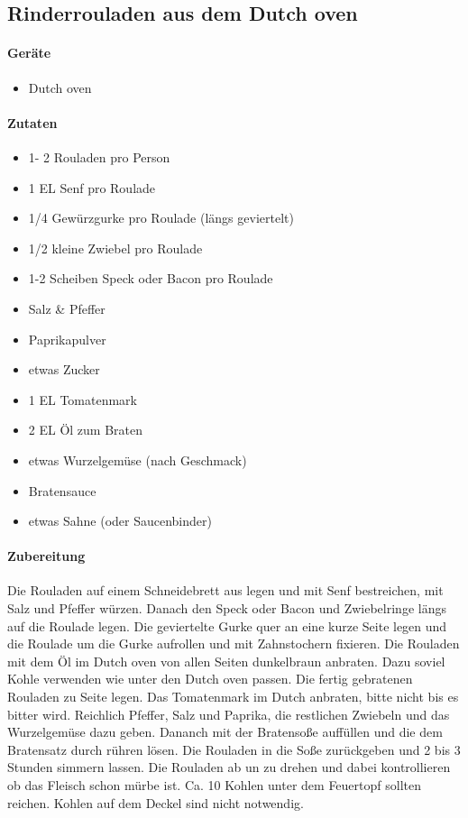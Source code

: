 \subsection{Rinderrouladen aus dem Dutch oven}

\paragraph{Geräte}

\begin{itemize}[noitemsep]
	\item Dutch oven
\end{itemize}

\paragraph{Zutaten}

\begin{itemize}[noitemsep]
	\item 1- 2 Rouladen pro Person
	\item 1 EL Senf pro Roulade
	\item 1/4 Gewürzgurke pro Roulade (längs geviertelt)
	\item 1/2 kleine Zwiebel pro Roulade
	\item 1-2 Scheiben Speck oder Bacon pro Roulade
	\item Salz \& Pfeffer
	\item Paprikapulver
	\item etwas Zucker
	\item 1 EL Tomatenmark
	\item 2 EL Öl zum Braten
	\item etwas Wurzelgemüse (nach Geschmack)
	\item Bratensauce
	\item etwas Sahne (oder Saucenbinder)
\end{itemize}

\paragraph{Zubereitung}

Die Rouladen auf einem Schneidebrett aus legen und mit Senf bestreichen, 
mit Salz und Pfeffer würzen. Danach den Speck oder Bacon und 
Zwiebelringe längs auf die Roulade legen. Die geviertelte Gurke quer an 
eine kurze Seite legen und die Roulade um die Gurke aufrollen und mit 
Zahnstochern fixieren.
Die Rouladen mit dem Öl im Dutch oven von allen Seiten dunkelbraun 
anbraten. Dazu soviel Kohle verwenden wie unter den Dutch oven passen. 
Die fertig gebratenen Rouladen zu Seite legen. 
Das Tomatenmark im Dutch anbraten, bitte nicht bis es bitter wird. 
Reichlich Pfeffer, Salz und Paprika, die restlichen Zwiebeln und das 
Wurzelgemüse dazu geben. Dananch mit der Bratensoße auffüllen und die 
dem Bratensatz durch rühren lösen. Die Rouladen in die Soße zurückgeben 
und 2 bis 3 Stunden simmern lassen. Die Rouladen ab un zu drehen und 
dabei kontrollieren ob das Fleisch schon mürbe ist. Ca. 10 Kohlen unter 
dem Feuertopf sollten reichen. Kohlen auf dem Deckel sind nicht 
notwendig.
\newpage

